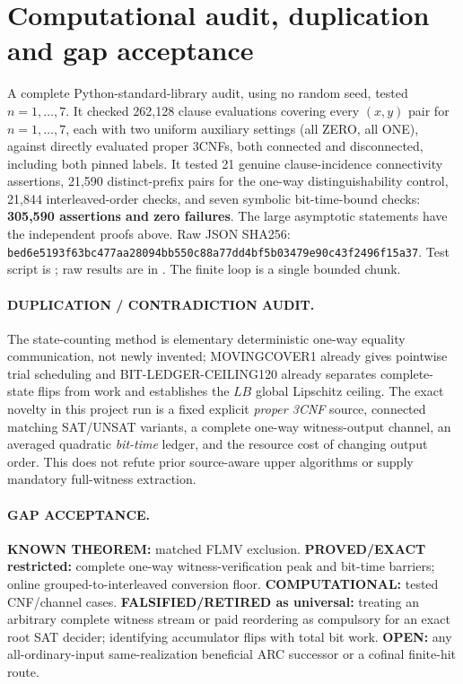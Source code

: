\documentclass[11pt]{article}
\begin{document}
\section{Computational audit, duplication and gap acceptance}
A complete Python-standard-library audit, using no random seed, tested $n=1,\ldots,7$. It checked 262,128 clause evaluations covering every $(x,y)$ pair for $n=1,\ldots,7$, each with two uniform auxiliary settings (all ZERO, all ONE), against directly evaluated proper 3CNFs, both connected and disconnected, including both pinned labels. It tested 21 genuine clause-incidence connectivity assertions, 21,590 distinct-prefix pairs for the one-way distinguishability control, 21,844 interleaved-order checks, and seven symbolic bit-time-bound checks: \textbf{305,590 assertions and zero failures}. The large asymptotic statements have the independent proofs above. Raw JSON SHA256: \texttt{bed6e5193f63bc477aa28094bb550c88a77dd4bf5b03479e90c43f2496f15a37}. Test script is ; raw results are in . The finite loop is a single bounded chunk.

\paragraph{DUPLICATION / CONTRADICTION AUDIT.}
The state-counting method is elementary deterministic one-way equality communication, not newly invented; MOVINGCOVER1 already gives pointwise trial scheduling and BIT-LEDGER-CEILING120 already separates complete-state flips from work and establishes the $LB$ global Lipschitz ceiling. The exact novelty in this project run is a fixed explicit \emph{proper 3CNF} source, connected matching SAT/UNSAT variants, a complete one-way witness-output channel, an averaged quadratic \emph{bit-time} ledger, and the resource cost of changing output order. This does not refute prior source-aware upper algorithms or supply mandatory full-witness extraction.

\paragraph{GAP ACCEPTANCE.}
\textbf{KNOWN THEOREM:} matched FLMV exclusion. \textbf{PROVED/EXACT restricted:} complete one-way witness-verification peak and bit-time barriers; online grouped-to-interleaved conversion floor. \textbf{COMPUTATIONAL:} tested CNF/channel cases. \textbf{FALSIFIED/RETIRED as universal:} treating an arbitrary complete witness stream or paid reordering as compulsory for an exact root SAT decider; identifying accumulator flips with total bit work. \textbf{OPEN:} any all-ordinary-input same-realization beneficial ARC successor or a cofinal finite-hit route.
\end{document}
